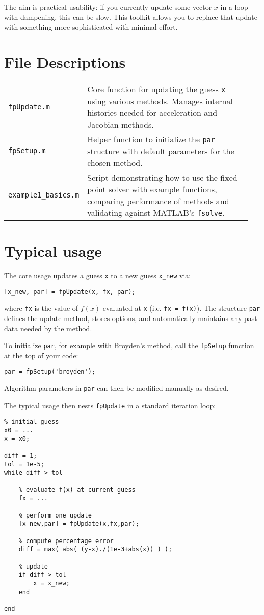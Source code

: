 \documentclass[a4paper,12pt]{article}
\newcommand{\code}[1]{\texttt{#1}}
\begin{document}
The aim is practical usability: if you currently update some vector $x$ in a loop with dampening, this can be slow. This toolkit allows you to replace that update with something more sophisticated with minimal effort.

\section{File Descriptions}

\begin{tabular}{p{0.25\linewidth}p{0.7\linewidth}}
\code{fpUpdate.m} & Core function for updating the guess \code{x} using various methods. Manages internal histories needed for acceleration and Jacobian methods. \\
\code{fpSetup.m} & Helper function to initialize the \code{par} structure with default parameters for the chosen method. \\
\code{example1\_basics.m} & Script demonstrating how to use the fixed point solver with example functions, comparing performance of methods and validating against MATLAB’s \code{fsolve}.
\end{tabular}

\section{Typical usage}

The core usage updates a guess \code{x} to a new guess \code{x\_new} via:
\begin{lstlisting}
[x_new, par] = fpUpdate(x, fx, par);
\end{lstlisting}
where \code{fx} is the value of $f(x)$ evaluated at \code{x} (i.e. \code{fx = f(x)}). The structure \code{par} defines the update method, stores options, and automatically maintains any past data needed by the method.

To initialize \code{par}, for example with Broyden's method, call the \code{fpSetup} function at the top of your code:
\begin{lstlisting}
par = fpSetup('broyden');
\end{lstlisting}
Algorithm parameters in \code{par} can then be modified manually as desired. 

The typical usage then nests \code{fpUpdate} in a standard iteration loop:
\begin{lstlisting}
% initial guess
x0 = ...
x = x0;

diff = 1;
tol = 1e-5;
while diff > tol

    % evaluate f(x) at current guess
    fx = ...

    % perform one update
    [x_new,par] = fpUpdate(x,fx,par);

    % compute percentage error
    diff = max( abs( (y-x)./(1e-3+abs(x)) ) );

    % update
    if diff > tol
        x = x_new;
    end

end
\end{lstlisting}
\end{document}
